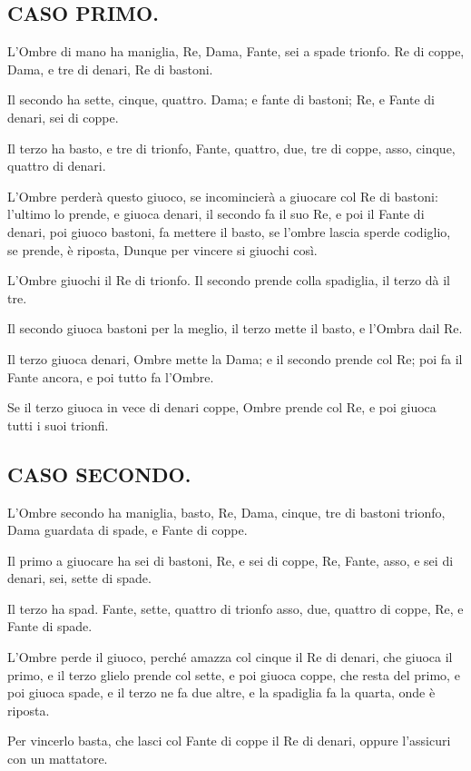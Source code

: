 \documentclass[11pt,a6paper]{article}
\begin{document}
\subsection{CASO PRIMO.}

L'Ombre di mano ha maniglia, Re, Dama,
Fante, sei a spade trionfo. Re di coppe,
Dama, e tre di denari, Re di bastoni.

Il secondo ha sette, cinque, quattro. Dama; e
fante di bastoni; Re, e Fante di denari, sei di coppe.

Il terzo ha basto, e tre di trionfo, Fante,
quattro, due, tre di coppe, asso, cinque,
quattro di denari.

L'Ombre perderà questo giuoco, se incomincierà
a giuocare col Re di bastoni: l'ultimo
lo prende, e giuoca denari, il secondo
fa il suo Re, e poi il Fante di denari, poi
giuoco bastoni, fa mettere il basto, se l'ombre
lascia sperde codiglio, se prende, è riposta,
Dunque per vincere si giuochi così.

L'Ombre giuochi il Re di trionfo. Il secondo
prende colla spadiglia, il terzo dà il
tre.

Il secondo giuoca bastoni per la meglio,
il terzo mette il basto, e l'Ombra dail Re.

Il terzo giuoca denari, Ombre mette la
Dama; e il secondo prende col Re; poi fa il
Fante ancora, e poi tutto fa l'Ombre.

Se il terzo giuoca in vece di denari coppe,
Ombre prende col Re, e poi giuoca
tutti i suoi trionfi.

\subsection{CASO SECONDO.}

L'Ombre secondo ha maniglia, basto, Re,
Dama, cinque, tre di bastoni trionfo,
Dama guardata di spade, e Fante di coppe.

Il primo a giuocare ha sei di bastoni,
Re, e sei di coppe, Re, Fante, asso, e sei
di denari, sei, sette di spade.

Il terzo ha spad. Fante, sette, quattro di
trionfo asso, due, quattro di coppe, Re,
e Fante di spade.

L'Ombre perde il giuoco, perché amazza
col cinque il Re di denari, che giuoca il
primo, e il terzo glielo prende col sette, e
poi giuoca coppe, che resta del primo, e poi
giuoca spade, e il terzo ne fa due altre, e la
spadiglia fa la quarta, onde è riposta.

Per vincerlo basta, che lasci col Fante di
coppe il Re di denari, oppure l'assicuri con
un mattatore.
\end{document}
